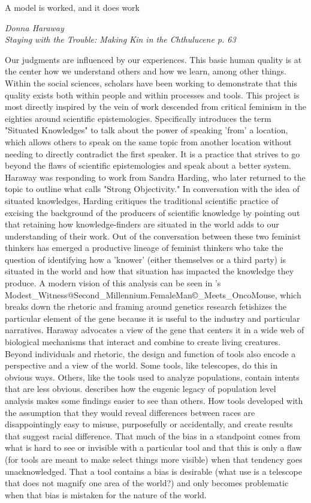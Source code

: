 \documentclass[a4paper,man,natbib]{apa6}
\begin{document}
   \epigraph{A model is worked, and it does work}{\textit{Donna Haraway \\ Staying with the Trouble: Making Kin in the Chthulucene p. 63}}

   Our judgments are influenced by our experiences. This basic human quality is at the center how we understand others and how we learn, among other things. Within the social sciences, scholars have been working to demonstrate that this quality exists both within people and within processes and tools. This project is most directly inspired by the vein of work descended from critical feminism in the eighties around scientific epistemologies. Specifically \citet{Haraway1988-nh} introduces the term "Situated Knowledges" to talk about the power of speaking 'from' a location, which allows others to speak on the same topic from another location without needing to directly contradict the first speaker. It is a practice that strives to go beyond the flaws of scientific epistemologies and speak about a better system. Haraway was responding to work from Sandra Harding, who later returned to the topic to outline what \citet{Harding1992-od} calls "Strong Objectivity." In conversation with the idea of situated knowledges, Harding critiques the traditional scientific practice of excising the background of the producers of scientific knowledge by pointing out that retaining how knowledge-finders are situated in the world adds to our understanding of their work. Out of the conversation between these two feminist thinkers has emerged a productive lineage of feminist thinkers who take the question of identifying how a 'knower' (either themselves or a third party) is situated in the world and how that situation has impacted the knowledge they produce. A modern vision of this analysis can be seen in \citet{Harraway1997-va}'s Modest\_Witness@Second\_Millennium.FemaleMan\copyright\_Meets\_OncoMouse\texttrademark, which breaks down the rhetoric and framing around genetics research fetishizes the particular element of the gene because it is useful to the industry and particular narratives. Haraway advocates a view of the gene that centers it in a wide web of biological mechanisms that interact and combine to create living creatures. Beyond individuals and rhetoric, the design and function of tools also encode a perspective and a view of the world. Some tools, like telescopes, do this in obvious ways. Others, like the tools used to analyze populations, contain intents that are less obvious. \citet{Subramaniam2014-wg} describes how the eugenic legacy of population level analysis makes some findings easier to see than others. How tools developed with the assumption that they would reveal differences between races are disappointingly easy to misuse, purposefully or accidentally, and create results that suggest racial difference. That much of the bias in a standpoint comes from what is hard to see or invisible with a particular tool and that this is only a flaw (for tools are meant to make select things more visible) when that tendency goes unacknowledged. That a tool contains a bias is desirable (what use is a telescope that does not magnify one area of the world?) and only becomes problematic when that bias is mistaken for the nature of the world.
\end{document}
